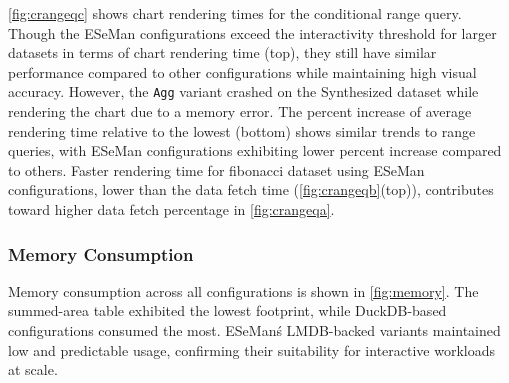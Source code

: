 \begin{refsection}
\autoref{fig:crangeqc} shows chart rendering times for the conditional range query. Though the ESeMan configurations exceed the interactivity threshold for larger datasets in terms of chart rendering time (top), they still have similar performance compared to other configurations while maintaining high visual accuracy. However, the \texttt{Agg} variant crashed on the Synthesized dataset while rendering the chart due to a memory error. The percent increase of average rendering time relative to the lowest (bottom) shows similar trends to range queries, with ESeMan configurations exhibiting lower percent increase compared to others. Faster rendering time for fibonacci dataset using ESeMan configurations, lower than the data fetch time (\autoref{fig:crangeqb}(top)), contributes toward higher data fetch percentage in \autoref{fig:crangeqa}.



\subsubsection{Memory Consumption}
Memory consumption across all configurations is shown in \autoref{fig:memory}. The summed-area table exhibited the lowest footprint, while DuckDB-based configurations consumed the most. ESeMan\'s LMDB-backed variants maintained low and predictable usage, confirming their suitability for interactive workloads at scale.


\end{refsection}
